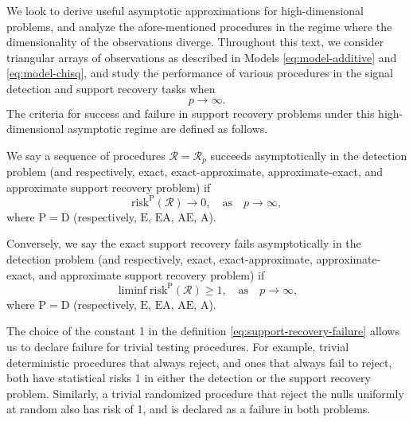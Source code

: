 
We look to derive useful asymptotic approximations for high-dimensional problems, and analyze the afore-mentioned procedures in the regime where the dimensionality of the observations diverge.
Throughout this text, we consider triangular arrays of observations as described in Models \eqref{eq:model-additive} and \eqref{eq:model-chisq}, and study the performance of various procedures in the signal detection and support recovery tasks when 
\begin{equation*}
  p\to\infty.
\end{equation*}
The criteria for success and failure in support recovery problems under this high-dimensional asymptotic regime are defined as follows.
\begin{definition} \label{def:exact-recovery-success-failure}
We say a sequence of procedures $\mathcal{R} = \mathcal{R}_p$ succeeds asymptotically in the detection problem (and respectively, exact, exact-approximate, approximate-exact, and approximate support recovery problem) if 
\begin{equation} \label{eq:support-recovery-success}
    \mathrm{risk}^{\mathrm{P}}(\mathcal{R}) \to 0, \quad \text{as}\quad p\to\infty,
\end{equation}
where $\mathrm{P}=\mathrm{D}$ (respectively, $\mathrm{E}$, $\mathrm{EA}$, $\mathrm{AE}$, $\mathrm{A}$).

Conversely, we say the exact support recovery fails asymptotically in the detection problem (and respectively, exact, exact-approximate, approximate-exact, and approximate support recovery problem) if 
\begin{equation} \label{eq:support-recovery-failure}
    \liminf\mathrm{risk}^{\mathrm{P}}(\mathcal{R}) \ge 1, \quad \text{as}\quad p\to\infty,
\end{equation}
where $\mathrm{P}=\mathrm{D}$ (respectively, $\mathrm{E}$, $\mathrm{EA}$, $\mathrm{AE}$, $\mathrm{A}$).
\end{definition}
The choice of the constant 1 in the definition \eqref{eq:support-recovery-failure} allows us to declare failure for trivial testing procedures. 
For example, trivial deterministic procedures that always reject, and ones that always fail to reject, both have statistical risks 1 in either the detection or the support recovery problem.
Similarly, a trivial randomized procedure that reject the nulls uniformly at random also has risk of 1, and is declared as a failure in both problems.

